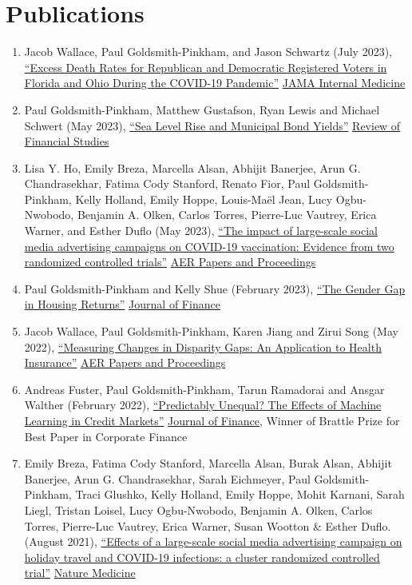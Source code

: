 \documentclass[letterpaper]{article}
\begin{document}
\section*{Publications}

\begin{enumerate}
\item Jacob Wallace, Paul Goldsmith-Pinkham, and Jason Schwartz (July 2023), \href{https://jamanetwork.com/journals/jamainternalmedicine/fullarticle/2807617}{``Excess Death Rates for Republican and Democratic Registered Voters in Florida and Ohio During the COVID-19 Pandemic''} \ul{JAMA Internal Medicine}
\item Paul Goldsmith-Pinkham, Matthew Gustafson, Ryan Lewis and Michael Schwert (May 2023), \href{http://paulgp.github.io/papers/ggls_munis.pdf}{``Sea Level Rise and Municipal Bond Yields''} \ul{Review of Financial Studies}
\item Lisa Y. Ho, Emily Breza, Marcella Alsan, Abhijit Banerjee, Arun G. Chandrasekhar, Fatima Cody Stanford, Renato Fior, Paul Goldsmith-Pinkham, Kelly Holland, Emily Hoppe, Louis-Maël Jean, Lucy Ogbu-Nwobodo, Benjamin A. Olken, Carlos Torres, Pierre-Luc Vautrey, Erica Warner, and Esther Duflo (May 2023), \href{https://paulgp.github.io/papers/submission_manuscript_appendix_social_media_covid_vaccines.pdf}{``The impact of large-scale social media advertising campaigns on COVID-19 vaccination: Evidence from two randomized controlled trials''} \ul{AER Papers and Proceedings}
\item Paul Goldsmith-Pinkham and Kelly Shue (February 2023), \href{https://paulgp.github.io/papers/Gender_Gap_in_Housing_Returns.pdf}{``The Gender Gap in Housing Returns''} \ul{Journal of Finance}
\item  Jacob Wallace, Paul Goldsmith-Pinkham, Karen Jiang and Zirui Song (May 2022), \href{https://paulgp.github.io/papers/aerpp_medicare.pdf}{``Measuring Changes in Disparity Gaps: An Application to Health Insurance''} \ul{AER Papers and Proceedings}
\item Andreas Fuster, Paul Goldsmith-Pinkham, Tarun Ramadorai and Ansgar Walther (February 2022), \href{https://papers.ssrn.com/sol3/papers.cfm?abstract_id=3072038}{``Predictably Unequal? The Effects of Machine Learning in Credit Markets''} \ul{Journal of Finance}, Winner of Brattle Prize for Best Paper in Corporate Finance
\item Emily Breza, Fatima Cody Stanford, Marcella Alsan, Burak Alsan, Abhijit Banerjee, Arun G. Chandrasekhar, Sarah Eichmeyer, Paul Goldsmith-Pinkham, Traci Glushko, Kelly Holland, Emily Hoppe, Mohit Karnani, Sarah Liegl, Tristan Loisel, Lucy Ogbu-Nwobodo, Benjamin A. Olken, Carlos Torres, Pierre-Luc Vautrey, Erica Warner, Susan Wootton \& Esther Duflo. (August 2021), \href{https://www.nature.com/articles/s41591-021-01487-3.pdf}{``Effects of a large-scale social media advertising campaign on holiday travel and COVID-19 infections: a cluster randomized controlled trial''} \ul{Nature Medicine}

\end{enumerate}
\end{document}
